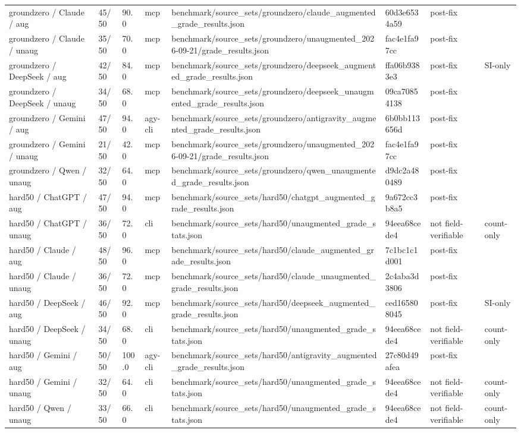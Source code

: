 \begin{table}[t]
\begin{tabular}{llllllll}
groundzero / Claude / aug & 45/50 & 90.0 & mcp & benchmark/source\_sets/groundzero/claude\_augmented\_grade\_results.json & 60d3e6534a59 & post-fix &  \\
groundzero / Claude / unaug & 35/50 & 70.0 & mcp & benchmark/source\_sets/groundzero/unaugmented\_2026-09-21/grade\_results.json & fac4e1fa97cc & post-fix &  \\
groundzero / DeepSeek / aug & 42/50 & 84.0 & mcp & benchmark/source\_sets/groundzero/deepseek\_augmented\_grade\_results.json & ffa06b9383e3 & post-fix & SI-only \\
groundzero / DeepSeek / unaug & 34/50 & 68.0 & mcp & benchmark/source\_sets/groundzero/deepseek\_unaugmented\_grade\_results.json & 09ca70854138 & post-fix &  \\
groundzero / Gemini / aug & 47/50 & 94.0 & agy-cli & benchmark/source\_sets/groundzero/antigravity\_augmented\_grade\_results.json & 6b0bb113656d & post-fix &  \\
groundzero / Gemini / unaug & 21/50 & 42.0 & mcp & benchmark/source\_sets/groundzero/unaugmented\_2026-09-21/grade\_results.json & fac4e1fa97cc & post-fix &  \\
groundzero / Qwen / unaug & 32/50 & 64.0 & mcp & benchmark/source\_sets/groundzero/qwen\_unaugmented\_grade\_results.json & d9dc2a480489 & post-fix &  \\
hard50 / ChatGPT / aug & 47/50 & 94.0 & mcp & benchmark/source\_sets/hard50/chatgpt\_augmented\_grade\_results.json & 9a672cc3b8a5 & post-fix &  \\
hard50 / ChatGPT / unaug & 36/50 & 72.0 & cli & benchmark/source\_sets/hard50/unaugmented\_grade\_stats.json & 94eea68cede4 & not field-verifiable & count-only \\
hard50 / Claude / aug & 48/50 & 96.0 & mcp & benchmark/source\_sets/hard50/claude\_augmented\_grade\_results.json & 7c1bc1c1d001 & post-fix &  \\
hard50 / Claude / unaug & 36/50 & 72.0 & mcp & benchmark/source\_sets/hard50/claude\_unaugmented\_grade\_results.json & 2c4aba3d3806 & post-fix &  \\
hard50 / DeepSeek / aug & 46/50 & 92.0 & mcp & benchmark/source\_sets/hard50/deepseek\_augmented\_grade\_results.json & ced165808045 & post-fix & SI-only \\
hard50 / DeepSeek / unaug & 34/50 & 68.0 & cli & benchmark/source\_sets/hard50/unaugmented\_grade\_stats.json & 94eea68cede4 & not field-verifiable & count-only \\
hard50 / Gemini / aug & 50/50 & 100.0 & agy-cli & benchmark/source\_sets/hard50/antigravity\_augmented\_grade\_results.json & 27c80d49afea & post-fix &  \\
hard50 / Gemini / unaug & 32/50 & 64.0 & cli & benchmark/source\_sets/hard50/unaugmented\_grade\_stats.json & 94eea68cede4 & not field-verifiable & count-only \\
hard50 / Qwen / unaug & 33/50 & 66.0 & cli & benchmark/source\_sets/hard50/unaugmented\_grade\_stats.json & 94eea68cede4 & not field-verifiable & count-only \\
\bottomrule
\end{tabular}
\end{table}

